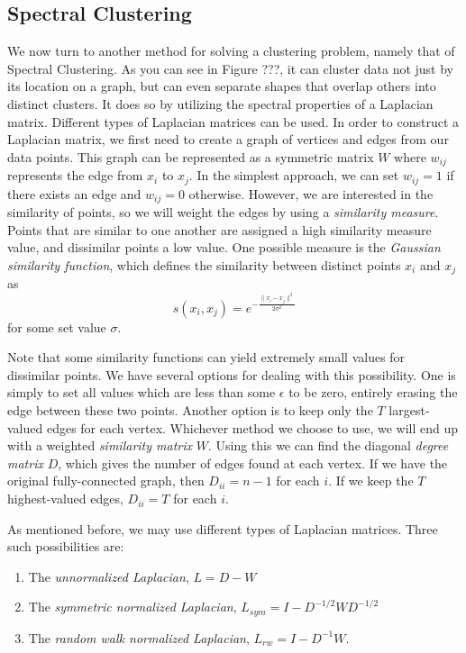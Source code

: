 \subsection*{Spectral Clustering}
We now turn to another method for solving a clustering problem, namely that of Spectral Clustering.  As you can see in Figure ???, it can cluster data not just by its location on a graph, but can even separate shapes that overlap others into distinct clusters.  It does so by utilizing the spectral properties of a Laplacian matrix.  Different types of Laplacian matrices can be used.  In order to construct a Laplacian matrix, we first need to create a graph of vertices and edges from our data points.  This graph can be represented as a symmetric matrix $W$ where $w_{ij}$ represents the edge from $x_i$ to $x_j$.  In the simplest approach, we can set $w_{ij} = 1$ if there exists an edge and $w_{ij} = 0$ otherwise.  However, we are interested in the similarity of points, so we will weight the edges by using a \emph{similarity measure}.  Points that are similar to one another are assigned a high similarity measure value, and dissimilar points a low value.  One possible measure is the \emph{Gaussian similarity function}, which defines the similarity between distinct points $x_i$ and $x_j$ as
\begin{equation*}
s(x_i,x_j) = e^{- \frac{\| x_i - x_j \| ^2}{2 \sigma ^2}}
\end{equation*}
for some set value $\sigma$.

Note that some similarity functions can yield extremely small values for dissimilar points.  We have several options for dealing with this possibility.  One is simply to set all values which are less than some $\epsilon$ to be zero, entirely erasing the edge between these two points.  Another option is to keep only the $T$ largest-valued edges for each vertex.  Whichever method we choose to use, we will end up with a weighted \emph{similarity matrix} $W$.  Using this we can find the diagonal \emph{degree matrix} $D$, which gives the number of edges found at each vertex.  If we have the original fully-connected graph, then $D_{ii} = n-1$ for each $i$.  If we keep the $T$ highest-valued edges, $D_{ii} = T$ for each $i$.

As mentioned before, we may use different types of Laplacian matrices.  Three such possibilities are:
\begin{enumerate}
    \item The \emph{unnormalized Laplacian}, $L = D - W$
    \item The \emph{symmetric normalized Laplacian}, $L_{sym} = I - D^{-1/2}WD^{-1/2}$
    \item The \emph{random walk normalized Laplacian}, $L_{rw} = I - D^{-1}W$.
 \end{enumerate}

